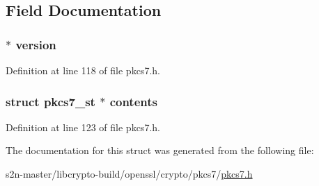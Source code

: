 \subsection{Field Documentation}
\subsubsection[{\texorpdfstring{version}{version}}]{ $\ast$ version}\hypertarget{structpkcs7__signed__st_abf367aeef355b6acf5be7c569c4b28b0}{}\label{structpkcs7__signed__st_abf367aeef355b6acf5be7c569c4b28b0}


Definition at line 118 of file pkcs7.\+h.

\subsubsection[{\texorpdfstring{contents}{contents}}]{\setlength{\rightskip}{0pt plus 5cm}struct {\bf pkcs7\+\_\+st} $\ast$ contents}\hypertarget{structpkcs7__signed__st_aeef95972194d66973936592656c73700}{}\label{structpkcs7__signed__st_aeef95972194d66973936592656c73700}


Definition at line 123 of file pkcs7.\+h.



The documentation for this struct was generated from the following file\+:\begin{DoxyCompactItemize}
\item 
s2n-\/master/libcrypto-\/build/openssl/crypto/pkcs7/\hyperlink{crypto_2pkcs7_2pkcs7_8h}{pkcs7.\+h}\end{DoxyCompactItemize}
